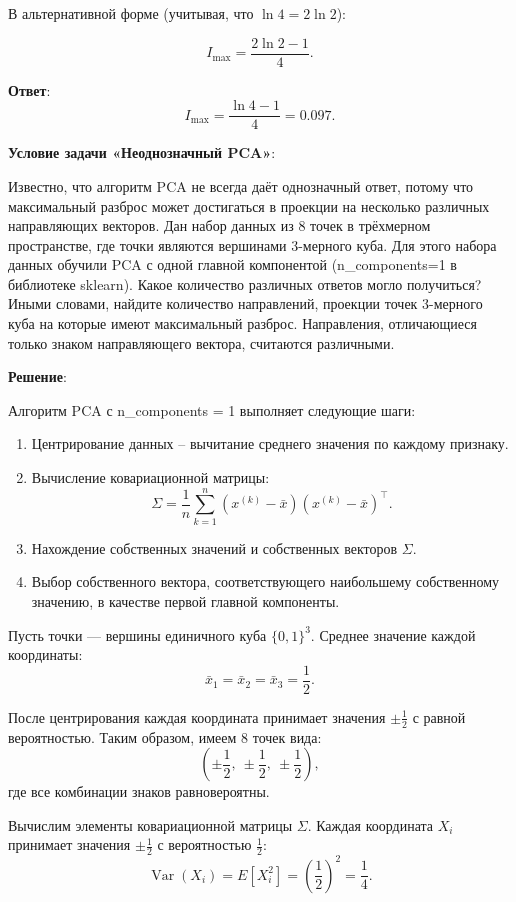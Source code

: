 \documentclass[pract]{SCWorks}
\begin{document}
    В альтернативной форме (учитывая, что $\ln 4 = 2\ln 2$):

    \[
    I_{\max} = \frac{2\ln 2 - 1}{4}.
    \]

    \textbf{Ответ}:
    \[
    \boxed{I_{\max} = \frac{\ln 4 - 1}{4} = 0.097}.
    \]

    \textbf{Условие задачи «Неоднозначный PCA»}:

    Известно, что алгоритм PCA не всегда даёт однозначный ответ, потому что максимальный разброс может достигаться в проекции на несколько различных направляющих векторов.
    Дан набор данных из 8 точек в трёхмерном пространстве, где точки являются вершинами 3-мерного куба.
    Для этого набора данных обучили PCA с одной главной компонентой (n\_components=1 в библиотеке sklearn).
    Какое количество различных ответов могло получиться?
    Иными словами, найдите количество направлений, проекции точек 3-мерного куба на которые имеют максимальный разброс.
    Направления, отличающиеся только знаком направляющего вектора, считаются различными.

    \textbf{Решение}:

    Алгоритм PCA с n\_components = 1 выполняет следующие шаги:
    \begin{enumerate}
        \item[$\bullet$] Центрирование данных – вычитание среднего значения по каждому признаку.
        \item[$\bullet$] Вычисление ковариационной матрицы:
        \[
        \Sigma = \frac{1}{n} \sum_{k=1}^{n} (x^{(k)} - \bar{x})(x^{(k)} - \bar{x})^{\top}.
        \]
        \item[$\bullet$] Нахождение собственных значений и собственных векторов $\Sigma$.
        \item[$\bullet$] Выбор собственного вектора, соответствующего наибольшему собственному значению, в качестве первой главной компоненты.
    \end{enumerate}

    Пусть точки — вершины единичного куба $\{0,1\}^3$. Среднее значение каждой координаты:
    \[
    \bar{x}_1 = \bar{x}_2 = \bar{x}_3 = \frac{1}{2}.
    \]

    После центрирования каждая координата принимает значения $\pm\frac{1}{2}$ с равной вероятностью. Таким образом, имеем 8 точек вида:
    \[
    \left(\pm\frac{1}{2},\ \pm\frac{1}{2},\ \pm\frac{1}{2}\right),
    \]
    где все комбинации знаков равновероятны.

    Вычислим элементы ковариационной матрицы $\Sigma$.
    Каждая координата $X_i$ принимает значения $\pm\frac{1}{2}$ с вероятностью $\frac{1}{2}$:
    \[
    \operatorname{Var}(X_i) = E[X_i^2] = \left(\frac{1}{2}\right)^2 = \frac{1}{4}.
    \]
\end{document}
